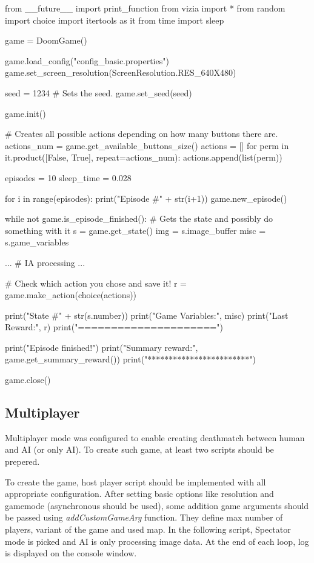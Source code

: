 \begin{pblock}
from __future__ import print_function
from vizia import *
from random import choice
import itertools as it
from time import sleep

game = DoomGame()

game.load_config("config_basic.properties")
game.set_screen_resolution(ScreenResolution.RES_640X480)

seed = 1234
# Sets the seed.
game.set_seed(seed)

game.init()

# Creates all possible actions depending on how many buttons there are.
actions_num = game.get_available_buttons_size()
actions = []
for perm in it.product([False, True], repeat=actions_num):
    actions.append(list(perm))

episodes = 10
sleep_time = 0.028

for i in range(episodes):
	print("Episode #" + str(i+1))
	game.new_episode()

	while not game.is_episode_finished():
		# Gets the state and possibly do something with it
		s = game.get_state()
		img = s.image_buffer
		misc = s.game_variables

		...
		# IA processing
		...		
		
		# Check which action you chose and save it!
		r = game.make_action(choice(actions))
		
		
		print("State #" + str(s.number))
		print("Game Variables:", misc)
		print("Last Reward:", r)
		print("=====================")

	print("Episode finished!")
	print("Summary reward:", game.get_summary_reward())
	print("************************")


game.close()
\end{pblock}

\subsection {Multiplayer}
	Multiplayer mode was configured to enable creating deathmatch between human and AI (or only AI). To create such game, at least two scripts should be prepered.


	To create the game, host player script should be implemented with all appropriate configuration. After setting basic options like resolution and gamemode (asynchronous should be used), some addition game arguments should be passed using \emph{addCustomGameArg} function. They define max number of players, variant of the game and used map. In the following script, Spectator mode is picked and AI is only processing image data. At the end of each loop, log is displayed on the console window.

